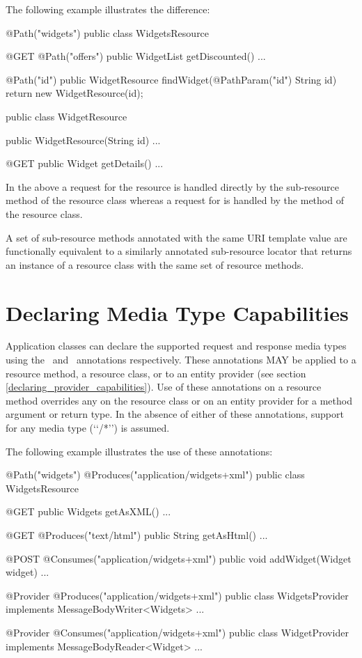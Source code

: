The following example illustrates the difference:

\begin{listing}{1}
@Path("widgets")
public class WidgetsResource {
  @GET
  @Path("offers")
  public WidgetList getDiscounted() {...}
  
  @Path("{id}")
  public WidgetResource findWidget(@PathParam("id") String id) {
    return new WidgetResource(id);
  }
}

public class WidgetResource {
  public WidgetResource(String id) {...}

  @GET
  public Widget getDetails() {...}
}\end{listing}

In the above a  request for the  resource is handled directly by the  sub-resource method of the resource class  whereas a  request for  is handled by the  method of the  resource class.

\begin{nnnote}A set of sub-resource methods annotated with the same URI template value are functionally equivalent to a similarly annotated sub-resource locator that returns an instance of a resource class with the same set of resource methods.\end{nnnote}

\section{Declaring Media Type Capabilities}
\label{declaring_method_capabilities}

Application classes can declare the supported request and response media types using the \Consumes\ and \Produces\ annotations respectively. These annotations MAY be applied to a resource method, a resource class, or to an entity provider (see section \ref{declaring_provider_capabilities}). Use of these annotations on a resource method overrides any on the resource class or on an entity provider for a method argument or return type. In the absence of either of these annotations, support for any media type (\lq\lq*/*\rq\rq) is assumed.

The following example illustrates the use of these annotations:

\begin{listing}{1}
@Path("widgets")
@Produces("application/widgets+xml")
public class WidgetsResource {
  
  @GET
  public Widgets getAsXML() {...}
  
  @GET
  @Produces("text/html")
  public String getAsHtml() {...}
  
  @POST
  @Consumes("application/widgets+xml")
  public void addWidget(Widget widget) {...}
}

@Provider
@Produces("application/widgets+xml")
public class WidgetsProvider implements MessageBodyWriter<Widgets> {...}

@Provider
@Consumes("application/widgets+xml")
public class WidgetProvider implements MessageBodyReader<Widget> {...}
\end{listing}

